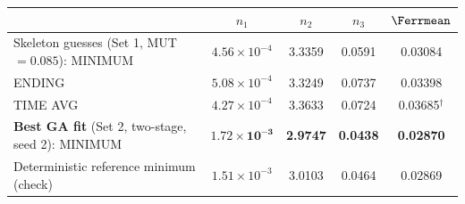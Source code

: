 \begin{tabular}{@{}l c c c c@{}}
\toprule
 & $n_1$ & $n_2$ & $n_3$ & $\Ferrmean$\\
\midrule
Skeleton guesses (Set 1, MUT $=0.085$): MINIMUM & $4.56\times10^{-4}$ & 3.3359 & 0.0591 & 0.03084\\
\phantom{Skeleton guesses (Set 1, MUT $=0.085$):} ENDING & $5.08\times10^{-4}$ & 3.3249 & 0.0737 & 0.03398\\
\phantom{Skeleton guesses (Set 1, MUT $=0.085$):} TIME AVG & $4.27\times10^{-4}$ & 3.3633 & 0.0724 & 0.03685$^\dagger$\\
\midrule
\textbf{Best GA fit} (Set 2, two-stage, seed 2): MINIMUM & $\mathbf{1.72\times10^{-3}}$ & \textbf{2.9747} & \textbf{0.0438} & \textbf{0.02870}\\
\midrule
Deterministic reference minimum (check) & $1.51\times10^{-3}$ & 3.0103 & 0.0464 & 0.02869\\
\bottomrule
\end{tabular}
